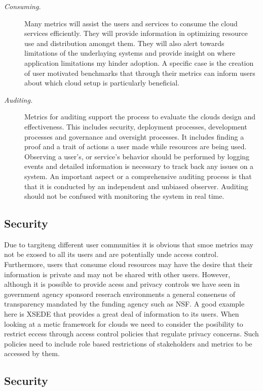 \documentclass{sig-alternate-05-2015}
\begin{document}
\begin{description}
\item[\it Consuming.] Many metrics will assist the users and services to consume the cloud services efficiently. They will provide information in optimizing resource use and distribution amongst them. They will also alert towards limitations of the underlaying systems and provide insight on where application limitations my hinder adoption. A specific case is the creation of user motivated benchmarks that through their metrics can inform users about which cloud setup is particularly beneficial.

\item[\it Auditing.] Metrics for auditing support the process to evaluate the clouds design and effectiveness. This includes security, deployment processes, development processes and governance and oversight processes.  It includes finding a proof and a trait of actions a user made while resources are being used. Observing a user's, or service's behavior should be performed by logging events and detailed information is necessary to track back any issues on a system.  An important aspect or a comprehensive auditing process is that that it is conducted by an independent and unbiased observer. Auditing should not be confused with monitoring the system in real time.

\end{description}


\subsection{Security}

Due to targiteng different user communities it is obvious that smoe metrics may not be exosed to all its users and are potentially unde access control. Furthermore, users that consume cloud resources may have the desire that their information is private and may not be shared with other users. However, although it is possible to provide acess and privacy controls we have seen in government agency sponsord reserach environments a general consensus of transparency mandated by the funding agency such as NSF. A good example here is XSEDE that provides a great deal of information to its users. When looking at a metic framework for clouds we need to consider the posibility to restrict eccess through access control policies that regulate privacy concerns. Such policies need to include role based restrictions of stakeholders and metrics to be accessed by them.

\subsection{Security}
\end{document}
